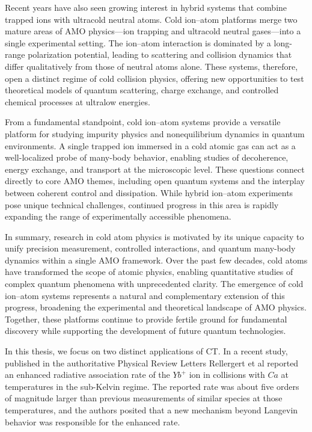 \medskip
\noindent
Recent years have also seen growing interest in hybrid systems that combine trapped ions with ultracold neutral atoms. Cold ion--atom platforms merge two mature areas of AMO physics—ion trapping and ultracold neutral gases—into a single experimental setting. The ion--atom interaction is dominated by a long-range polarization potential, leading to scattering and collision dynamics that differ qualitatively from those of neutral atoms alone. These systems, therefore, open a distinct regime of cold collision physics, offering new opportunities to test theoretical models of quantum scattering, charge exchange, and controlled chemical processes at ultralow energies.

\medskip
\noindent
From a fundamental standpoint, cold ion--atom systems provide a versatile platform for studying impurity physics and nonequilibrium dynamics in quantum environments. A single trapped ion immersed in a cold atomic gas can act as a well-localized probe of many-body behavior, enabling studies of decoherence, energy exchange, and transport at the microscopic level. These questions connect directly to core AMO themes, including open quantum systems and the interplay between coherent control and dissipation. While hybrid ion--atom experiments pose unique technical challenges, continued progress in this area is rapidly expanding the range of experimentally accessible phenomena.

\medskip
\noindent
In summary, research in cold atom physics is motivated by its unique capacity to unify precision measurement, controlled interactions, and quantum many-body dynamics within a single AMO framework. Over the past few decades, cold atoms have transformed the scope of atomic physics, enabling quantitative studies of complex quantum phenomena with unprecedented clarity. The emergence of cold ion--atom systems represents a natural and complementary extension of this progress, broadening the experimental and theoretical landscape of AMO physics. Together, these platforms continue to provide fertile ground for fundamental discovery while supporting the development of future quantum technologies.

In this thesis, we focus on two distinct applications of CT. In a recent study, published in the authoritative Physical Review Letters \cite{Ref4} Rellergert et al reported an enhanced radiative association rate of the $Yb^{+}$ ion in collisions with $Ca$ at temperatures in the sub-Kelvin regime. The reported rate was about five orders of magnitude larger than previous measurements of similar species
at those temperatures, and the authors posited that a new mechanism beyond Langevin behavior was responsible for the enhanced rate.

